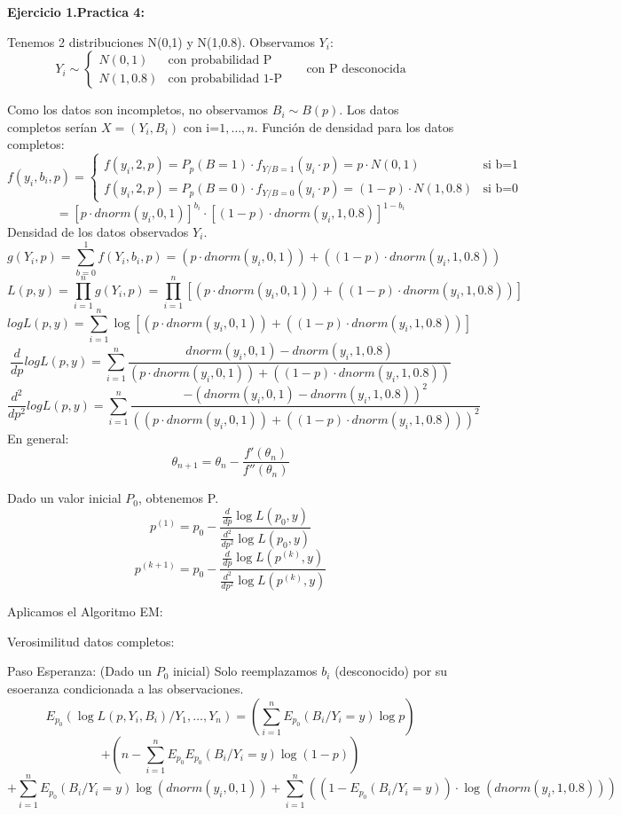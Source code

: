 \textbf{Ejercicio 1.Practica 4:}

Tenemos 2 distribuciones N(0,1) y N(1,0.8). Observamos $Y_i$:
\[
Y_i \sim \left\{
    \begin{matrix}
        N(0,1) & \text{con probabilidad P}\\
        N(1,0.8) & \text{con probabilidad 1-P}
    \end{matrix}
\right.\
\quad
\text{ con P desconocida}
\]

Como los datos son incompletos, no observamos $B_i \sim B(p)$. Los datos completos serían $X=(Y_i,B_i)$ con i=$1,\dots,n$.
Función de densidad para los datos completos:
\[
f(y_i,b_i,p)=\left\{
    \begin{matrix}
        f(y_i,2,p)=P_p(B=1) \cdot f_{Y/B=1}(y_i \cdot p)= p \cdot N(0,1) & \text{si b=1}\\
        f(y_i,2,p)=P_p(B=0) \cdot f_{Y/B=0}(y_i \cdot p)= (1-p) \cdot N(1,0.8) & \text{si b=0}
    \end{matrix}
\right.\
\]
\[
=[p \cdot dnorm(y_i,0,1)]^{b_i} \cdot [(1-p) \cdot dnorm(y_i,1,0.8)]^{1-b_i}
\]
Densidad de los datos observados $Y_i$.
\[
g(Y_i,p)=\sum_{b=0}^{1} f(Y_i,b_i,p)=(p \cdot dnorm(y_i,0,1)) + ((1-p) \cdot dnorm(y_i,1,0.8))
\]
\[
L(p,y)=\prod_{i=1}^{n} g(Y_i,p)=\prod_{i=1}^{n} [(p \cdot dnorm(y_i,0,1)) + ((1-p) \cdot dnorm(y_i,1,0.8))]
\]
\[
log L(p,y)=\sum_{i=1}^{n} \log [(p \cdot dnorm(y_i,0,1)) + ((1-p) \cdot dnorm(y_i,1,0.8))]
\]
\[
\frac{d}{dp} log L(p,y)= \sum_{i=1}^{n} \frac{dnorm(y_i,0,1)-dnorm(y_i,1,0.8)}{(p \cdot dnorm(y_i,0,1)) + ((1-p) \cdot dnorm(y_i,1,0.8))}
\]
\[
\frac{d^2}{dp^2} log L(p,y)= \sum_{i=1}^{n} \frac{-(dnorm(y_i,0,1)-dnorm(y_i,1,0.8))^2}{((p \cdot dnorm(y_i,0,1)) + ((1-p) \cdot dnorm(y_i,1,0.8)))^2}
\]
En general:
\[
\theta_{n+1}=\theta_n
-\frac{f'(\theta_n)}{f''(\theta_n)}\]

Dado un valor inicial $P_0$, obtenemos P.
\[
p^{(1)}=p_0-\frac{\frac{d}{dp}\log L(p_0,y)}{\frac{d^2}{dp^2}\log L(p_0,y)}
\]
\[
p^{(k+1)}=p_0-\frac{\frac{d}{dp}\log L(p^{(k)},y)}{\frac{d^2}{dp^2}\log L(p^{(k)},y)}
\]

Aplicamos el Algoritmo EM:

Verosimilitud datos completos:

Paso Esperanza: (Dado un $P_0$ inicial) Solo reemplazamos $b_i$ (desconocido) por su esoeranza condicionada a las observaciones.
\[
E_{p_0}(\log L(p,Y_i,B_i)/Y_1,\dots,Y_n)=(\sum_{i=1}^{n} E_{p_0}(B_i/Y_i=y) \log p)
\]\[
+(n-\sum_{i=1}^{n} E_{p_0} E_{p_0}(B_i/Y_i=y) \log (1-p))
\]\[
+\sum_{i=1}^{n} E_{p_0}(B_i/Y_i=y) \log(dnorm(y_i,0,1))+ \sum_{i=1}^{n} ((1-E_{p_0}(B_i/Y_i=y))\cdot \log(dnorm(y_i,1,0.8)))
\]

